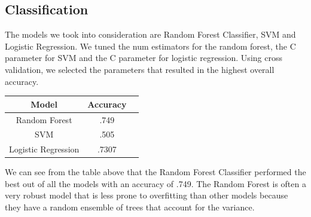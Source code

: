 \documentclass[twocolumn,10pt]{asme2ej}
\begin{document}
\subsection{Classification}
The models we took into consideration are Random Forest Classifier, SVM and Logistic Regression. We tuned the num estimators for the random forest, the C parameter for SVM and the C parameter for logistic regression. Using cross validation, we selected the parameters that resulted in the highest overall accuracy. 
\begin{center}
\begin{tabular}{ |c|c|c| } 
\hline
  {\bf{Model}} & {\bf{Accuracy}}  \\ 
 \hline
 Random Forest &   .749\\ 
 \hline
 SVM &   .505\\ 
 \hline
 Logistic Regression & .7307  \\ 
 \hline
\end{tabular}
\end{center}

We can see from the table above that the Random Forest Classifier performed the best out of all the models with an accuracy of .749. The Random Forest is often a very robust model that is less prone to overfitting than other models because they have a random ensemble of trees that account for the variance.
\end{document}
